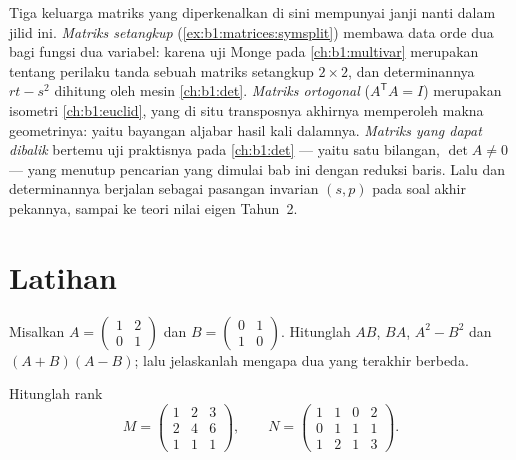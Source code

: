 \begin{remark}
\label{rem:b1:matrices:perspectives}
Tiga keluarga matriks yang diperkenalkan di sini mempunyai janji nanti dalam
jilid ini. \emph{Matriks setangkup}
(\cref{ex:b1:matrices:symsplit}) membawa data orde dua bagi
fungsi dua variabel: karena uji Monge pada
\cref{ch:b1:multivar} merupakan  tentang perilaku tanda
sebuah matriks setangkup $2\times2$, dan determinannya $rt - s^2$
dihitung oleh mesin \cref{ch:b1:det}. \emph{Matriks
ortogonal} ($A^{\mathsf T}A = I$) merupakan isometri
\cref{ch:b1:euclid}, yang di situ transposnya akhirnya memperoleh makna
geometrinya: yaitu bayangan aljabar hasil kali
dalamnya. \emph{Matriks yang dapat dibalik} bertemu uji praktisnya
pada \cref{ch:b1:det} --- yaitu satu bilangan, $\det A \neq 0$ --- yang menutup
pencarian yang dimulai bab ini dengan reduksi baris. Lalu  dan
determinannya berjalan sebagai pasangan invarian $(s, p)$ pada
soal akhir pekannya, sampai ke teori nilai eigen
Tahun~2.
\end{remark}

\section{Latihan}

\begin{exercise}[$\star$]\label{exo:b1:matrices:1}
Misalkan $A = \begin{pmatrix} 1 & 2 \\ 0 & 1 \end{pmatrix}$ dan $B =
\begin{pmatrix} 0 & 1 \\ 1 & 0\end{pmatrix}$. Hitunglah $AB$, $BA$,
$A^2 - B^2$ dan $(A+B)(A-B)$; lalu jelaskanlah mengapa dua yang terakhir berbeda.
\end{exercise}

\begin{exercise}[$\star$]\label{exo:b1:matrices:2}
Hitunglah rank
\[
M = \begin{pmatrix}
1 & 2 & 3\\
2 & 4 & 6\\
1 & 1 & 1
\end{pmatrix},
\qquad
N = \begin{pmatrix}
1 & 1 & 0 & 2\\
0 & 1 & 1 & 1\\
1 & 2 & 1 & 3
\end{pmatrix}.
\]
\end{exercise}

